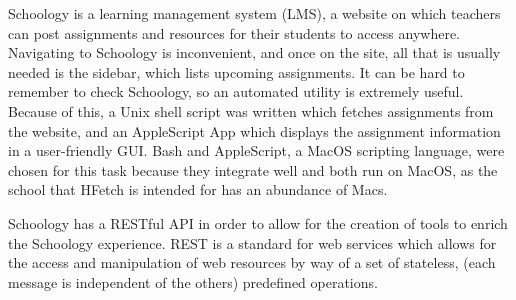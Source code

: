 Schoology is a learning management system (LMS), a website on which teachers can post assignments and resources for their students to access anywhere.\cite{scgy-promo}
Navigating to Schoology is inconvenient,
	and once on the site,
	all that is usually needed is the sidebar,
	which lists upcoming assignments.
It can be hard to remember to check Schoology,
	so an automated utility is extremely useful.
Because of this,
	a Unix shell script\cite{getassgns} was written which fetches assignments from the website,
	and an AppleScript App which displays the assignment information in a user-friendly GUI.
Bash and AppleScript, a MacOS scripting language, were chosen for this task because they integrate well and both run on MacOS,
	as the school that HFetch is intended for has an abundance of Macs.

Schoology has a RESTful API in order to allow for the creation of tools to enrich the Schoology experience.\cite{api-docs}
REST is a standard for web services which allows for the access and manipulation of web resources
	by way of a set of stateless,
	(each message is independent of the others) predefined operations.\cite{rest}